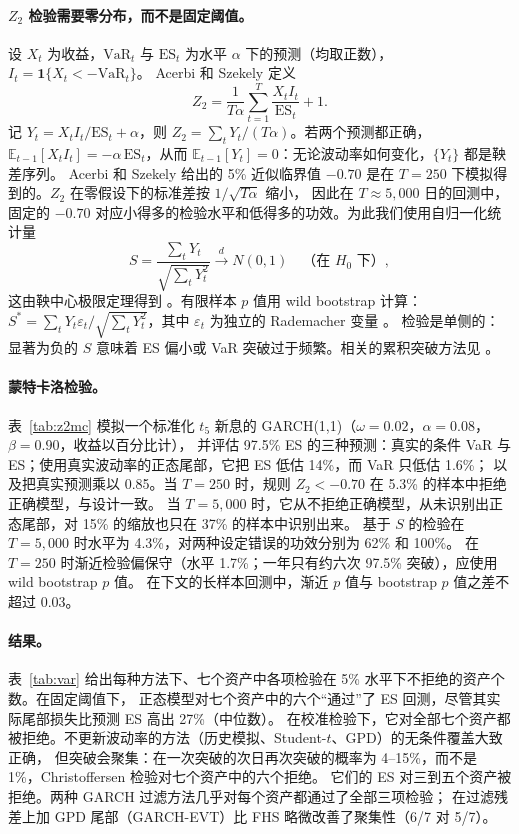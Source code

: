 \documentclass[11pt,UTF8]{ctexart}
\newcommand{\E}{\mathbb{E}}
\newcommand{\1}{\mathbf{1}}
\begin{document}
\paragraph{$Z_2$ 检验需要零分布，而不是固定阈值。}
设 $X_t$ 为收益，$\mathrm{VaR}_t$ 与 $\mathrm{ES}_t$ 为水平 $\alpha$ 下的预测（均取正数），$I_t = \1\{X_t < -\mathrm{VaR}_t\}$。
Acerbi 和 Szekely 定义
\begin{equation}
Z_2 = \frac{1}{T\alpha}\sum_{t=1}^{T}\frac{X_t I_t}{\mathrm{ES}_t} + 1 .
\end{equation}
记 $Y_t = X_t I_t/\mathrm{ES}_t + \alpha$，则 $Z_2 = \sum_t Y_t/(T\alpha)$。若两个预测都正确，
$\E_{t-1}[X_t I_t] = -\alpha\,\mathrm{ES}_t$，从而 $\E_{t-1}[Y_t]=0$：无论波动率如何变化，$\{Y_t\}$ 都是鞅差序列。
Acerbi 和 Szekely 给出的 5\% 近似临界值 $-0.70$ 是在 $T=250$ 下模拟得到的。$Z_2$ 在零假设下的标准差按 $1/\sqrt{T\alpha}$ 缩小，
因此在 $T\approx 5{,}000$ 日的回测中，固定的 $-0.70$ 对应小得多的检验水平和低得多的功效。为此我们使用自归一化统计量
\begin{equation}
S = \frac{\sum_t Y_t}{\sqrt{\sum_t Y_t^2}} \xrightarrow{d} N(0,1)\quad\text{（在 } H_0 \text{ 下）},
\end{equation}
这由鞅中心极限定理得到 \citep{hallheyde1980}。有限样本 $p$ 值用 wild bootstrap 计算：
$S^{*} = \sum_t Y_t\varepsilon_t/\sqrt{\sum_t Y_t^2}$，其中 $\varepsilon_t$ 为独立的 Rademacher 变量 \citep{wu1986,mammen1993}。
检验是单侧的：显著为负的 $S$ 意味着 ES 偏小或 VaR 突破过于频繁。相关的累积突破方法见 \citet{duescanciano2017}。

\paragraph{蒙特卡洛检验。}
表~\ref{tab:z2mc} 模拟一个标准化 $t_5$ 新息的 GARCH(1,1)（$\omega=0.02$，$\alpha=0.08$，$\beta=0.90$，收益以百分比计），
并评估 97.5\% ES 的三种预测：真实的条件 VaR 与 ES；使用真实波动率的正态尾部，它把 ES 低估 14\%，而 VaR 只低估 1.6\%；
以及把真实预测乘以 0.85。当 $T=250$ 时，规则 $Z_2<-0.70$ 在 5.3\% 的样本中拒绝正确模型，与设计一致。
当 $T=5{,}000$ 时，它从不拒绝正确模型，从未识别出正态尾部，对 15\% 的缩放也只在 37\% 的样本中识别出来。
基于 $S$ 的检验在 $T=5{,}000$ 时水平为 4.3\%，对两种设定错误的功效分别为 62\% 和 100\%。
在 $T=250$ 时渐近检验偏保守（水平 1.7\%；一年只有约六次 97.5\% 突破），应使用 wild bootstrap $p$ 值。
在下文的长样本回测中，渐近 $p$ 值与 bootstrap $p$ 值之差不超过 0.03。



\paragraph{结果。}
表~\ref{tab:var} 给出每种方法下、七个资产中各项检验在 5\% 水平下不拒绝的资产个数。在固定阈值下，
正态模型对七个资产中的六个``通过''了 ES 回测，尽管其实际尾部损失比预测 ES 高出 27\%（中位数）。
在校准检验下，它对全部七个资产都被拒绝。不更新波动率的方法（历史模拟、Student-$t$、GPD）的无条件覆盖大致正确，
但突破会聚集：在一次突破的次日再次突破的概率为 4--15\%，而不是 1\%，Christoffersen 检验对七个资产中的六个拒绝。
它们的 ES 对三到五个资产被拒绝。两种 GARCH 过滤方法几乎对每个资产都通过了全部三项检验；
在过滤残差上加 GPD 尾部（GARCH-EVT）比 FHS 略微改善了聚集性（6/7 对 5/7）。
\end{document}
